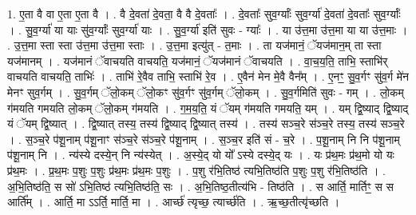 \documentclass[17pt]{extarticle}
\begin{document}
1. ए॒ता वै वा ए॒ता ए॒ता वै । . वै दे॒वता॑ दे॒वता॒ वै वै दे॒वताः᳚ । . दे॒वताः᳚ सुव॒र्ग्याः᳚ सुव॒र्ग्या॑ दे॒वता॑ दे॒वताः᳚ सुव॒र्ग्याः᳚ । . सु॒व॒र्ग्या॑ या याः सु॑व॒र्ग्याः᳚ सुव॒र्ग्या॑ याः । . सु॒व॒र्ग्या॑ इति॑ सुवः - ग्याः᳚ । . या उ॑त्त॒मा उ॑त्त॒मा या या उ॑त्त॒माः । . उ॒त्त॒मा स्ता स्ता उ॑त्त॒मा उ॑त्त॒मा स्ताः । . उ॒त्त॒मा इत्यु॑त् - त॒माः । . ता यज॑मानं॒ ॅयज॑मान॒म् ता स्ता यज॑मानम् । . यज॑मानं ॅवाचयति वाचयति॒ यज॑मानं॒ ॅयज॑मानं ॅवाचयति । . वा॒च॒य॒ति॒ ताभि॒ स्ताभि॑र् वाचयति वाचयति॒ ताभिः॑ । . ताभि॑ रे॒वैव ताभि॒ स्ताभि॑ रे॒व । . ए॒वैन॑ मेन मे॒वै वैन᳚म् । . ए॒नꣳ॒॒ सु॒व॒र्गꣳ सु॑व॒र्ग मे॑न मेनꣳ सुव॒र्गम् । . सु॒व॒र्गम् ॅलो॒कम् ॅलो॒कꣳ सु॑व॒र्गꣳ सु॑व॒र्गम् ॅलो॒कम् । . सु॒व॒र्गमिति॑ सुवः - गम् । . लो॒कम् ग॑मयति गमयति लो॒कम् ॅलो॒कम् ग॑मयति । . ग॒म॒य॒ति॒ यं ॅयम् ग॑मयति गमयति॒ यम् । . यम् द्वि॒ष्याद् द्वि॒ष्याद् यं ॅयम् द्वि॒ष्यात् । . द्वि॒ष्यात् तस्य॒ तस्य॑ द्वि॒ष्याद् द्वि॒ष्यात् तस्य॑ । . तस्य॑ सञ्च॒रे स॑ञ्च॒रे तस्य॒ तस्य॑ सञ्च॒रे । . स॒ञ्च॒रे प॑शू॒नाम् प॑शू॒नाꣳ स॑ञ्च॒रे स॑ञ्च॒रे प॑शू॒नाम् । . स॒ञ्च॒र इति॑ सं - च॒रे । . प॒शू॒नाम् नि नि प॑शू॒नाम् प॑शू॒नाम् नि । . न्य॑स्ये दस्ये॒न् नि न्य॑स्येत् । . अ॒स्ये॒द् यो यो᳚ ऽस्ये दस्ये॒द् यः । . यः प्र॑थ॒मः प्र॑थ॒मो यो यः प्र॑थ॒मः । . प्र॒थ॒मः प॒शुः प॒शुः प्र॑थ॒मः प्र॑थ॒मः प॒शुः । . प॒शु र॑भि॒तिष्ठ॑ त्यभि॒तिष्ठ॑ति प॒शुः प॒शु र॑भि॒तिष्ठ॑ति । . अ॒भि॒तिष्ठ॑ति॒ स सो॑ ऽभि॒तिष्ठ॑ त्यभि॒तिष्ठ॑ति॒ सः । . अ॒भि॒तिष्ठ॒तीत्य॑भि - तिष्ठ॑ति । . स आर्ति॒ मार्तिꣳ॒॒ स स आर्ति᳚म् । . आर्ति॒ मा ऽऽर्ति॒ मार्ति॒ मा । . आर्च्छ॑ त्यृच्छ॒ त्यार्च्छ॑ति । . ऋ॒च्छ॒तीत्यृ॑च्छति । \newline
\end{document}
